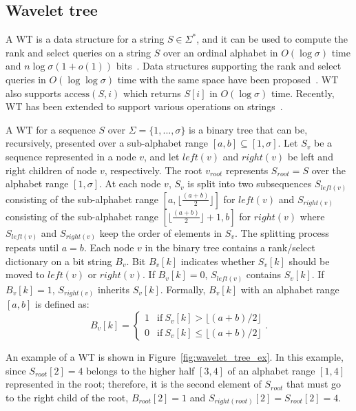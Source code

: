 \documentclass[10pt]{llncs}
\begin{document}
\subsection{Wavelet tree}
A WT is a data structure for a string $S \in \Sigma^*$, and 
it can be used to compute the rank and select queries on a string $S$ over an ordinal alphabet 
in $O(\log{\sigma})$ time and $n\log\sigma(1+o(1))$ bits~\cite{Grossi03}.
Data structures supporting the rank and select queries in $O(\log\log{\sigma})$ time 
with the same space have been proposed~\cite{Golynski2006,Jeremy2010}. 
WT also supports $\mbox{access}(S,i)$ which returns $S[i]$ in $O(\log{\sigma})$ time.
Recently, WT has been extended to support various operations on strings~\cite{Navarro2012-cpm}.

A WT for a sequence $S$ over $\Sigma=\{1,...,\sigma\}$ is a binary tree that 
can be, recursively, presented over a sub-alphabet range $[a,b] \subseteq [1,\sigma]$. 
Let $S_v$ be a sequence represented in a node $v$, and let 
$left(v)$ and $right(v)$ be left and right children of node $v$, respectively. 
The root $v_{root}$ represents $S_{root}=S$ over the alphabet range $[1,\sigma]$.
At each node $v$, $S_{v}$ is split into two subsequences $S_{left(v)}$ consisting of 
the sub-alphabet range $[a,\lfloor \frac{(a+b)}{2} \rfloor]$ for $left(v)$ 
and $S_{right(v)}$ consisting of the sub-alphabet range $[\lfloor \frac{(a+b)}{2} \rfloor + 1, b]$ 
for $right(v)$ where $S_{left(v)}$ and $S_{right(v)}$ keep the order of elements in $S_v$. 
The splitting process repeats until $a=b$. 
Each node $v$ in the binary tree contains a rank/select dictionary on a bit string $B_v$. 
Bit $B_v[k]$ indicates whether $S_v[k]$ should be moved to $left(v)$ or $right(v)$. 
If $B_v[k]=0$, $S_{left(v)}$ contains $S_{v}[k]$. 
If $B_v[k]=1$, $S_{right(v)}$ inherits $S_v[k]$. 
Formally, $B_v[k]$ with an alphabet range $[a,b]$ is defined as:
\[
B_v[k] = \left\{ \begin{array}{ll}
1 & \mbox{if} \ S_v[k] > \lfloor (a+b)/2 \rfloor \\ 0 & \mbox{if} \ S_v[k] \le \lfloor
(a+b)/2 \rfloor \end{array}
\right. .
\]

An example of a WT is shown in Figure~\ref{fig:wavelet_tree_ex}.
In this example, since $S_{root}[2]=4$ belongs to the higher half $[3,4]$ of an alphabet range $[1,4]$ represented in the root; therefore, it is the second element of $S_{root}$ that must go to the right child of the root, $B_{root}[2]=1$ and $S_{right(root)}[2]=S_{root}[2]=4$.
\end{document}
